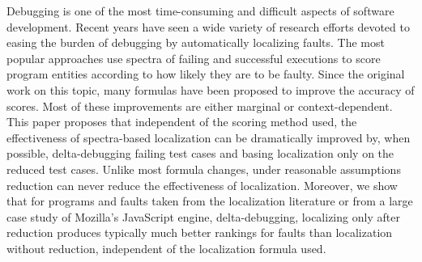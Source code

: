 Debugging is one of the most time-consuming and difficult aspects of
software development.  Recent years have seen a wide variety of
research efforts devoted to easing the burden of debugging by
automatically localizing faults.  The most popular approaches use
spectra of failing and successful executions to score program entities
according to how likely they are to be faulty.  Since the original
work on this topic, many formulas have been proposed to improve the
accuracy of scores.  Most of these improvements are either marginal or
context-dependent.  This paper proposes that independent of the
scoring method used, the effectiveness of spectra-based localization
can be dramatically improved by, when possible, delta-debugging
failing test cases and basing localization only on the reduced test
cases.  Unlike most formula changes, under reasonable assumptions
reduction can never reduce the effectiveness of localization.
Moreover, we show that for programs and faults taken from the
localization literature or from a large case study of Mozilla's
JavaScript engine, delta-debugging, localizing only after reduction
produces typically much better rankings for faults than localization
without reduction, independent of the localization formula used.
